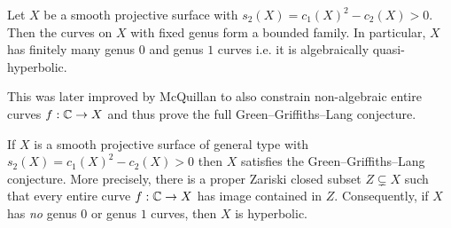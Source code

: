 \documentclass[main.tex]{subfiles}
\begin{document}
\begin{theorem}[Bogomolov, 1977] \cite{bogomolov:families_curves}
Let $X$ be a smooth projective surface with $s_2(X) = c_1(X)^2 - c_2(X) > 0$. Then the curves on $X$ with fixed genus form a bounded family. In particular, $X$ has finitely many genus $0$ and genus $1$ curves i.e. it is algebraically quasi-hyperbolic.
\end{theorem}

This was later improved by McQuillan to also constrain non-algebraic entire curves $f : \mathbb{C} \to X$ and thus prove the full Green--Griffiths--Lang conjecture.

\begin{theorem}[McQuillan, 1998] \cite{mcquillan:diophantine_approximation}
If $X$ is a smooth projective surface of general type with $s_2(X) = c_1(X)^2 - c_2(X) > 0$ then $X$ satisfies the Green--Griffiths--Lang conjecture. More precisely, there is a proper Zariski closed subset $Z \subsetneq X$ such that every entire curve $f : \mathbb{C} \to X$ has image contained in $Z$. Consequently, if $X$ has \textit{no} genus $0$ or genus $1$ curves, then $X$ is hyperbolic.
\end{theorem}
\end{document}
